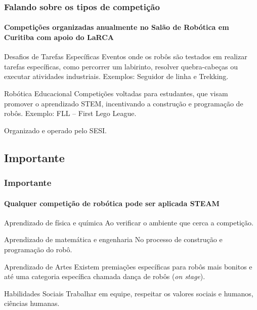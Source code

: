 \documentclass{beamer}
\begin{document}
\begin{frame}
	\frametitle{Falando sobre os tipos de competição}
	\framesubtitle{Competições organizadas anualmente no Salão de Robótica em Curitiba com apoio do LaRCA}
	\begin{block}{Desafios de Tarefas Específicas}
		Eventos onde os robôs são testados em realizar tarefas específicas, como percorrer um labirinto, resolver quebra-cabeças ou executar atividades industriais.
		\linebreak
		\linebreak
		Exemplos: Seguidor de linha e Trekking.
	\end{block}
	\begin{block}{Robótica Educacional}
		Competições voltadas para estudantes, que visam promover o aprendizado STEM, incentivando a construção e programação de robôs.
		\linebreak
		\linebreak
		Exemplo: FLL -- First Lego League.
		
		Organizado e operado pelo SESI.
	\end{block}
\end{frame}

\subsection{Importante}
\begin{frame}
	\frametitle{Importante}
	\framesubtitle{Qualquer competição de robótica pode ser aplicada STEAM}
	\begin{block}{Aprendizado de física e química}
		Ao verificar o ambiente que cerca a competição.
	\end{block}

	\begin{block}{Aprendizado de matemática e engenharia}
		No processo de construção e programação do robô.
	\end{block}

	\begin{block}{Aprendizado de Artes}
		Existem premiações específicas para robôs mais bonitos e até uma categoria específica chamada dança de robôs (\emph{on stage}).
	\end{block}

	\begin{block}{Habilidades Sociais}
		Trabalhar em equipe, respeitar os valores sociais e humanos, ciências humanas.
	\end{block}

\end{frame}
\end{document}
